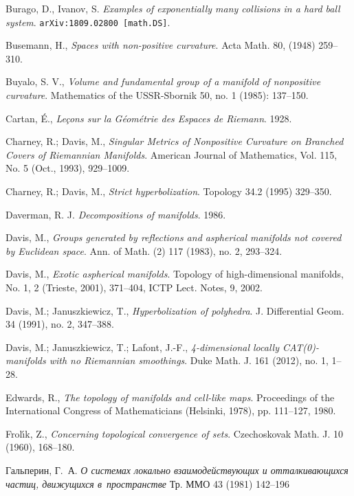 \begin{thebibliography}{52}
Burago, D., Ivanov, S. 
\textit{Examples of exponentially many collisions in a hard ball system}.
\texttt{arXiv:1809.02800 [math.DS]}.
 

Busemann, H., 
\textit{Spaces with non-positive curvature}.
Acta Math. 
80, 
(1948) 
259--310.

Buyalo, S. V.,
\textit{Volume and fundamental group of a manifold of nonpositive curvature}.
Mathematics of the USSR-Sbornik 50, no. 1 (1985): 137--150.

Cartan, \'E.,
\textit{Le\c{c}ons sur la G\'eom\'etrie des Espaces de Riemann}. 1928.

Charney, R.;
Davis, M.,
\textit{Singular Metrics of Nonpositive Curvature on Branched Covers of Riemannian Manifolds}.
American Journal of Mathematics, 
Vol. 115, 
No. 5 
(Oct., 1993), 
929--1009.

Charney, R.; Davis, M., 
\textit{Strict hyperbolization}.
Topology 
34.2 
(1995) 
329--350.

Daverman, R. J.
\textit{Decompositions of manifolds}. 1986.

Davis, M., 
\textit{Groups generated by reflections and aspherical manifolds not covered by Euclidean space}.
Ann. of Math. 
(2) 117 
(1983), 
no. 2, 
293--324. 

Davis, M.,
\textit{Exotic aspherical manifolds}.
Topology of high-dimensional manifolds, 
No. 1, 2 (Trieste, 2001), 371--404, ICTP Lect. Notes, 9, 2002.



Davis, M.; 
Januszkiewicz, T., 
\textit{Hyperbolization of polyhedra}. 
J. Differential Geom. 
34 
(1991), 
no. 2, 
347--388.

Davis, M.; 
Januszkiewicz, T.; 
Lafont, J.-F.,
\textit{4-dimensional locally CAT(0)-manifolds with no Riemannian smoothings}. 
Duke Math. J. 
161 
(2012), 
no. 1, 
1--28.

Edwards, R.,
\textit{The topology of manifolds and cell-like maps}.
Proceedings of the International Congress of Mathematicians (Helsinki, 1978), pp. 111--127, 1980.

Frol\'{\i}k, Z., 
\textit{Concerning topological convergence of sets}.
Czechoskovak Math. J. 
10 
(1960), 
168--180.

\begin{otherlanguage}{russian} 
Гальперин, Г.~А.
\textit{О системах локально взаимодействующих и отталкивающихся частиц, движущихся в~пространстве}
Тр. ММО
43
(1981)
142--196
\end{otherlanguage}


\end{thebibliography}
